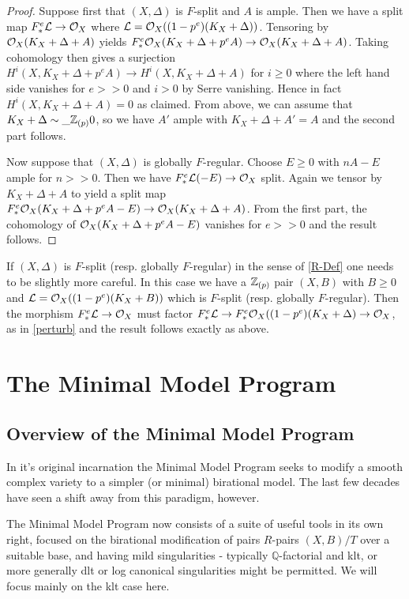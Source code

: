 \begin{proof}
	
	Suppose first that $(X,\Delta)$ is $F$-split and $A$ is ample. Then we have a split map $F^{e}_{*} \mathcal{L} \to \mathcal{O}_{X}$ where $\mathcal{L}=\mathcal{O}_{X}((1-p^{e})(K_{X}+\Delta))$. Tensoring by $\mathcal{O}_{X}(K_{X}+\Delta+A)$ yields $F^{e}_{*}\mathcal{O}_{X}(K_{X}+\Delta+p^{e}A) \to \mathcal{O}_{X}(K_{X}+\Delta+A)$. Taking cohomology then gives a surjection $H^{i}(X,K_{X}+\Delta+p^{e}A) \to H^{i}(X,K_{X}+\Delta+A)$ for $i \geq 0$ where the left hand side vanishes for $e>>0$ and $i>0$ by Serre vanishing. Hence in fact $H^{i}(X,K_{X}+\Delta+A)=0$ as claimed. From above, we can assume that $K_{X}+\Delta\sim\_{\mathbb{Z}_{(p)}} 0$, so we have $A'$ ample with $K_{X}+\Delta+A'=A$ and the second part follows.
	
	Now suppose that $(X,\Delta)$ is globally $F$-regular. Choose $E\geq 0$ with $nA-E$ ample for $n>>0$. Then we have $F^{e}_{*}\mathcal{L}(-E) \to \mathcal{O}_{X}$ split. Again we tensor by $K_{X}+\Delta+A$ to yield a split map $F^{e}_{*} \mathcal{O}_{X}(K_{X}+\Delta+p^{e}A-E) \to \mathcal{O}_{X}(K_{X}+\Delta+A)$. From the first part, the cohomology of $\mathcal{O}_{X}(K_{X}+\Delta+p^{e}A-E)$ vanishes for $e>>0$ and the result follows.
		
\end{proof}

If $(X,\Delta)$ is $F$-split (resp. globally $F$-regular) in the sense of \autoref{R-Def} one needs to be slightly more careful. In this case we have a $\mathbb{Z}_{(p)}$ pair $(X,B)$ with $B \geq 0$ and $\mathcal{L}=\mathcal{O}_{X}((1-p^{e})(K_{X}+B))$ which is $F$-split (resp. globally $F$-regular). Then the morphism $F^{e}_{*} \mathcal{L} \to \mathcal{O}_{X}$ must factor $F^{e}_{*} \mathcal{L} \to F^{e}_{*}\mathcal{O}_{X}((1-p^{e})(K_{X}+\Delta) \to \mathcal{O}_{X}$, as in \autoref{perturb} and the result follows exactly as above.

\section{The Minimal Model Program}\label{overview}

\subsection{Overview of the Minimal Model Program}\label{sub-overview}

In it's original incarnation the Minimal Model Program seeks to modify a smooth complex variety to a simpler (or minimal) birational model. The last few decades have seen a shift away from this paradigm, however. 

The Minimal Model Program now consists of a suite of useful tools in its own right, focused on the birational modification of pairs $R$-pairs $(X,B)/T$ over a suitable base, and having mild singularities - typically $\mathbb{Q}$-factorial and klt, or more generally dlt or log canonical singularities might be permitted. We will focus mainly on the klt case here.

